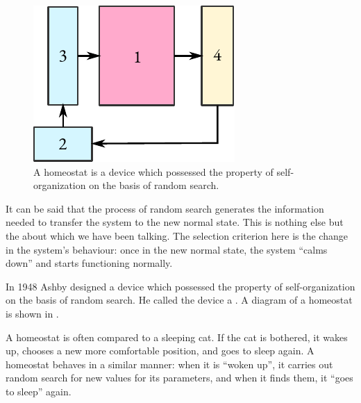 \begin{figure}
 \centering
 \includegraphics[width=0.9\linewidth]{figures/homeostat.pdf}
\caption{A homeostat is a device which possessed the property of
self-organization on the basis of random search.\label{homeostat}}
 \end{figure}

It can be said that the process of random search generates the
information needed to transfer the system to the new normal state. This
is nothing else but the  about which we have been talking. The selection criterion here is the change in the
system's behaviour: once in the new normal state, the system ``calms
down'' and starts functioning normally.

In 1948 Ashby designed a device which possessed the property of
self-organization on the basis of random search. He called the device
a . A diagram of a homeostat is shown in .

A homeostat is often compared to a sleeping cat. If the cat is bothered,
it wakes up, chooses a new more comfortable position, and goes to sleep
again. A homeostat behaves in a similar manner: when it is ``woken up'',
it carries out random search for new values for its parameters, and when
it finds them, it ``goes to sleep'' again.


